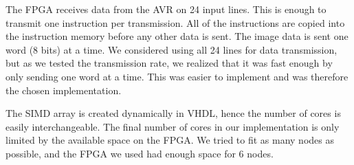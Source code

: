 The \ac{FPGA} receives data from the AVR on 24 input lines. This is enough to
transmit one instruction per transmission. All of the instructions are copied
into the instruction memory before any other data is sent. The image data is
sent one word (8 bits) at a time. We considered using all 24 lines for data
transmission, but as we tested the transmission rate, we realized that it was
fast enough by only sending one word at a time. This was easier to
implement and was therefore the chosen implementation.

The \ac{SIMD} array is created dynamically in \ac{VHDL}, hence the number of
cores is easily interchangeable. The final number of cores in our implementation
is only limited by the available space on the \ac{FPGA}. We tried to fit as many
nodes as possible, and the \ac{FPGA} we used had enough space for 6 nodes.
